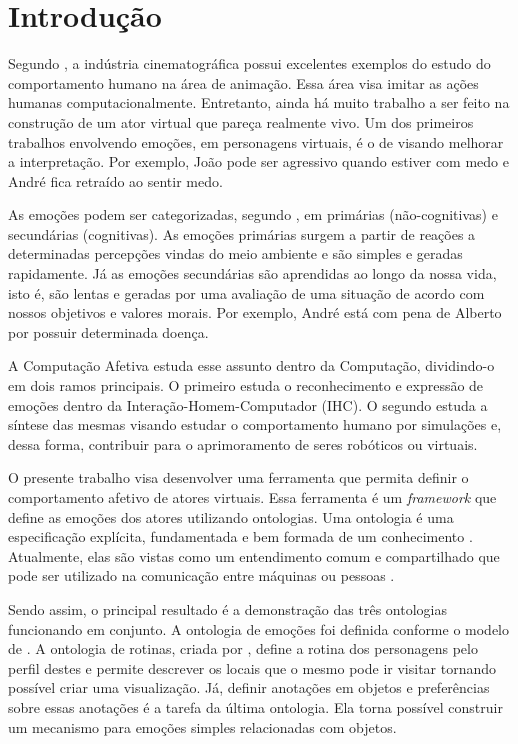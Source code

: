 \chapter{Introdução}

Segundo \citet{terzopoulos1998behavioral}, a indústria cinematográfica possui
excelentes exemplos do estudo do comportamento humano na área de animação.
Essa área visa imitar as ações humanas computacionalmente. Entretanto, ainda
há muito trabalho a ser feito na construção de um ator virtual que pareça
realmente vivo. Um dos primeiros trabalhos envolvendo emoções, em personagens
virtuais, é o de \citet{bates1994role} visando melhorar a interpretação. Por
exemplo, João pode ser agressivo quando estiver com medo e André fica retraído
ao sentir medo.

As emoções podem ser categorizadas, segundo \citet{damasio2004erro}, em
primárias (não-cognitivas) e secundárias (cognitivas). As emoções primárias
surgem a partir de reações a determinadas percepções vindas do meio ambiente e
são simples e geradas rapidamente. Já as emoções secundárias são aprendidas ao
longo da nossa vida, isto é, são lentas e geradas por uma avaliação de uma
situação de acordo com nossos objetivos e valores morais. Por exemplo, André
está com pena de Alberto por possuir determinada doença.

A Computação Afetiva estuda esse assunto dentro da Computação, dividindo-o em
dois ramos principais. O primeiro estuda o reconhecimento e expressão de
emoções dentro da Interação-Homem-Computador (IHC). O segundo estuda a
síntese das mesmas visando estudar o comportamento humano por simulações e,
dessa forma, contribuir para o aprimoramento de seres robóticos ou virtuais.

O presente trabalho visa desenvolver uma ferramenta que permita definir o
comportamento afetivo de atores virtuais. Essa ferramenta é um
\emph{framework} que define as emoções dos atores utilizando ontologias. Uma
ontologia é uma especificação explícita, fundamentada e bem formada de um
conhecimento \cite{gruber1993translation}. Atualmente, elas são vistas como um
entendimento comum e compartilhado que pode ser utilizado na comunicação entre
máquinas ou pessoas \cite{wks2008towards}.

Sendo assim, o principal resultado é a demonstração das três ontologias
funcionando em conjunto. A ontologia de emoções foi definida conforme o modelo
de \citet{ortony1988cse}. A ontologia de rotinas, criada por
\citet{paiva2005ontology}, define a rotina dos personagens pelo perfil destes
e permite descrever os locais que o mesmo pode ir visitar tornando possível
criar uma visualização. Já, definir anotações em objetos e preferências sobre
essas anotações é a tarefa da última ontologia. Ela torna possível construir
um mecanismo para emoções simples relacionadas com objetos.

